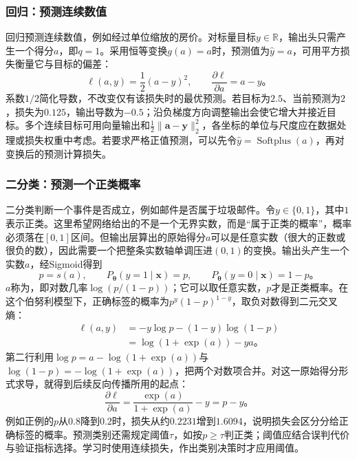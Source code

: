 \subsubsection{回归：预测连续数值}
\label{sec:ffn-output-regression}

回归预测连续数值，例如经过单位缩放的房价。对标量目标$y\in\mathbb R$，输出头只需产生一个得分$a$，即$q=1$。采用恒等变换$g(a)=a$时，预测值为$\widehat y=a$，可用平方损失衡量它与目标的偏差：
\begin{equation}
  \ell(a,y)=\frac12(a-y)^2,
  \qquad \frac{\partial\ell}{\partial a}=a-y\text{。}
  \label{eq:ffn-regression-loss}
\end{equation}
系数$1/2$简化导数，不改变仅有该损失时的最优预测。若目标为$2.5$、当前预测为$2$，损失为$0.125$，输出导数为$-0.5$；沿负梯度方向调整输出会使它增大并接近目标。多个连续目标可用向量输出和$\frac12\lVert\bm a-\bm y\rVert_2^2$，各坐标的单位与尺度应在数据处理或损失权重中考虑。若要求严格正值预测，可以先令$\widehat y=\operatorname{Softplus}(a)$，再对变换后的预测计算损失。

\subsubsection{二分类：预测一个正类概率}
\label{sec:ffn-output-binary}

二分类判断一个事件是否成立，例如邮件是否属于垃圾邮件。令$y\in\{0,1\}$，其中$1$表示正类。这里希望网络给出的不是一个无界实数，而是“属于正类的概率”，概率必须落在$[0,1]$区间。但输出层算出的原始得分$a$可以是任意实数（很大的正数或很负的数），因此需要一个把整条实数轴单调压进$(0,1)$的变换。输出头产生一个实数$a$，经Sigmoid得到
\[
  p=s(a),\qquad P_{\bm\theta}(y=1\mid\bm x)=p,\qquad
  P_{\bm\theta}(y=0\mid\bm x)=1-p\text{。}
\]
$a$称为，即对数几率$\log(p/(1-p))$；它可以取任意实数，$p$才是正类概率。在这个伯努利模型下，正确标签的概率为$p^y(1-p)^{1-y}$，取负对数得到二元交叉熵：
\begin{equation}
  \begin{aligned}
    \ell(a,y)
      &=-y\log p-(1-y)\log(1-p)\\
      &=\log(1+\exp(a))-ya\text{。}
  \end{aligned}
  \label{eq:ffn-binary-cross-entropy}
\end{equation}
第二行利用$\log p=a-\log(1+\exp(a))$与$\log(1-p)=-\log(1+\exp(a))$，把两个对数项合并。对这一原始得分形式求导，就得到后续反向传播所用的起点：
\[
  \frac{\partial\ell}{\partial a}
  =\frac{\exp(a)}{1+\exp(a)}-y=p-y\text{。}
\]
例如正例的$p$从$0.8$降到$0.2$时，损失从约$0.2231$增到$1.6094$，说明损失会区分分给正确标签的概率。预测类别还需规定阈值$\tau$，如按$p\geq\tau$判正类；阈值应结合误判代价与验证指标选择。学习时使用连续损失，作出类别决策时才应用阈值。

